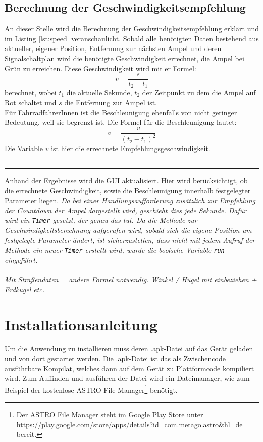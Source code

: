 \subsection{Berechnung der Geschwindigkeitsempfehlung}
An dieser Stelle wird die Berechnung der Geschwindigkeitsempfehlung erklärt und im Listing \ref{lst:speed} veranschaulicht.
Sobald alle benötigten Daten bestehend aus aktueller, eigener Position, Entfernung zur nächsten Ampel und deren Signalschaltplan wird die benötigte Geschwindigkeit errechnet, die Ampel bei Grün zu erreichen. Diese Geschwindigkeit wird mit er Formel: 
\[ v = \frac{s}{t_{2} - t_{1}} \]
berechnet, wobei $t_1$ die aktuelle Sekunde, $t_2$ der Zeitpunkt zu dem die Ampel auf Rot schaltet und $s$ die Entfernung zur Ampel ist. \\
Für FahrradfahrerInnen ist die Beschleunigung ebenfalls von nicht geringer Bedeutung, weil sie begrenzt ist. Die Formel für die Beschleunigung lautet:
\[ a = \frac{v}{(t_{2} - t_{1})^{2}} \] 
Die Variable $v$ ist hier die errechnete Empfehlungsgeschwindigkeit.
\begin{center}
\rule{35em}{0.5pt}  \rule{35em}{0.5pt}
\end{center}
Anhand der Ergebnisse wird die \gls{GUI} aktualisiert. Hier wird berücksichtigt, ob die errechnete Geschwindigkeit, sowie die Beschleunigung innerhalb festgelegter Parameter liegen.
\textit{ Da bei einer Handlungsaufforderung zusätzlich zur Empfehlung der Countdown der Ampel dargestellt wird, geschieht dies jede Sekunde. Dafür wird ein \texttt{Timer} gesetzt, der genau das tut. Da die Methode zur Geschwindigkeitsberechnung aufgerufen wird, sobald sich die eigene Position um \textit{festgelegte Parameter} ändert, ist sicherzustellen, dass nicht mit jedem Aufruf der Methode ein neuer \texttt{Timer} erstellt wird, wurde die boolsche Variable \texttt{run} eingeführt. }\\\\
\textit{Mit Straßendaten = andere Formel notwendig. Winkel / Hügel mit einbeziehen + Erdkugel etc.}
%
%
\section{Installationsanleitung}
Um die Anwendung zu installieren muss deren .apk-Datei auf das Gerät geladen und von dort gestartet werden. Die .apk-Datei ist das als Zwischencode ausführbare Kompilat, welches dann auf dem Gerät zu Plattformcode kompiliert wird. Zum Auffinden und ausführen der Datei wird ein Dateimanager, wie zum Beispiel der kostenlose ASTRO File Manager\footnote{ Der ASTRO File Manager steht im Google Play Store unter \url{https://play.google.com/store/apps/details?id=com.metago.astro&hl=de} bereit.}  benötigt. 
